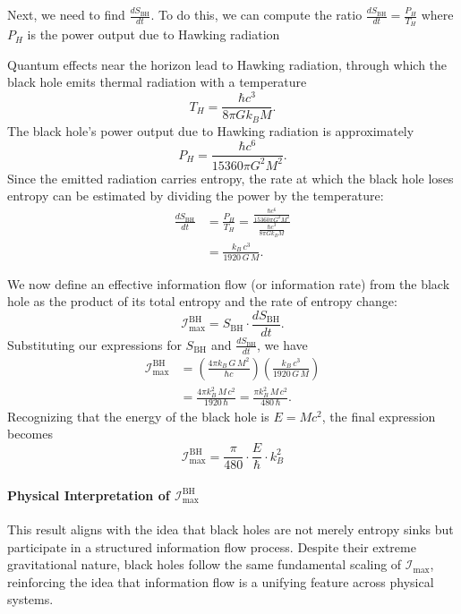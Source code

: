 \documentclass[12pt]{article}
\begin{document}
Next, we need to find $\frac{dS_{\text{BH}}}{dt}$. To do this, we can compute the ratio $\frac{dS_{\text{BH}}}{dt} = \frac{P_H}{T_H}$ where $P_H$ is the power output due to Hawking radiation

Quantum effects near the horizon lead to Hawking radiation, through which the black hole emits thermal radiation with a temperature
\begin{equation}
    T_H = \frac{\hbar c^3}{8\pi G k_B M}.
\end{equation}
The black hole’s power output due to Hawking radiation is approximately
\begin{equation}
    P_H = \frac{\hbar c^6}{15360\pi G^2 M^2}.
\end{equation}
Since the emitted radiation carries entropy, the rate at which the black hole loses entropy can be estimated by dividing the power by the temperature:
\begin{align}
    \frac{dS_{\text{BH}}}{dt} &= \frac{P_H}{T_H} 
    = \frac{\frac{\hbar c^6}{15360\pi G^2 M^2}}{\frac{\hbar c^3}{8\pi G k_B M}} \nonumber \\
    &= \frac{k_B\, c^3}{1920\, G\, M}.
\end{align}

We now define an effective information flow (or information rate) from the black hole as the product of its total entropy and the rate of entropy change:
\begin{equation}
    \mathcal{I}_{\text{max}}^{\text{BH}} = S_{\text{BH}} \cdot \frac{dS_{\text{BH}}}{dt}.
\end{equation}
Substituting our expressions for \(S_{\text{BH}}\) and \(\frac{dS_{\text{BH}}}{dt}\), we have
\begin{align}
    \mathcal{I}_{\text{max}}^{\text{BH}} 
    &= \left(\frac{4\pi k_B\, G\, M^2}{\hbar c}\right)
    \left(\frac{k_B\, c^3}{1920\, G\, M}\right) \nonumber \\
    &= \frac{4\pi k_B^2\, M\, c^2}{1920\, \hbar}
    = \frac{\pi k_B^2\, M\, c^2}{480\, \hbar}.
\end{align}
Recognizing that the energy of the black hole is \(E = M c^2\), the final expression becomes
\begin{equation}
    \mathcal{I}_{\text{max}}^{\text{BH}} = \frac{\pi}{480} \cdot \frac{E}{\hbar} \cdot k_B^2
\end{equation}

\paragraph{Physical Interpretation of \(\mathcal{I}_{\text{max}}^{\text{BH}}\)}
This result aligns with the idea that black holes are not merely entropy sinks but participate in a structured information flow process. Despite their extreme gravitational nature, black holes follow the same fundamental scaling of \(\mathcal{I}_{\text{max}}\), reinforcing the idea that information flow is a unifying feature across physical systems.
\end{document}
